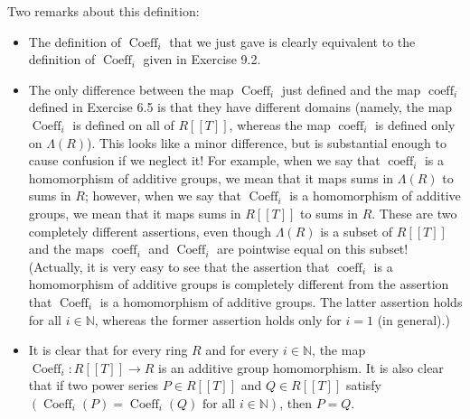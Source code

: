 \documentclass[numbers=enddot,12pt,final,onecolumn,notitlepage]{scrartcl}%
\begin{document}
Two remarks about this definition:

\begin{itemize}
\item The definition of $\operatorname*{Coeff}\nolimits_{i}$ that we just gave
is clearly equivalent to the definition of $\operatorname*{Coeff}%
\nolimits_{i}$ given in Exercise 9.2.

\item The only difference between the map $\operatorname*{Coeff}\nolimits_{i}$
just defined and the map $\operatorname*{coeff}\nolimits_{i}$ defined in
Exercise 6.5 is that they have different domains (namely, the map
$\operatorname*{Coeff}\nolimits_{i}$ is defined on all of $R\left[  \left[
T\right]  \right]  $, whereas the map $\operatorname*{coeff}\nolimits_{i}$ is
defined only on $\Lambda\left(  R\right)  $). This looks like a minor
difference, but is substantial enough to cause confusion if we neglect it! For
example, when we say that $\operatorname*{coeff}\nolimits_{i}$ is a
homomorphism of additive groups, we mean that it maps sums in $\Lambda\left(
R\right)  $ to sums in $R$; however, when we say that $\operatorname*{Coeff}%
\nolimits_{i}$ is a homomorphism of additive groups, we mean that it maps sums
in $R\left[  \left[  T\right]  \right]  $ to sums in $R$. These are two
completely different assertions, even though $\Lambda\left(  R\right)  $ is a
subset of $R\left[  \left[  T\right]  \right]  $ and the maps
$\operatorname*{coeff}\nolimits_{i}$ and $\operatorname*{Coeff}\nolimits_{i}$
are pointwise equal on this subset! (Actually, it is very easy to see that the
assertion that $\operatorname*{coeff}\nolimits_{i}$ is a homomorphism of
additive groups is completely different from the assertion that
$\operatorname*{Coeff}\nolimits_{i}$ is a homomorphism of additive groups. The
latter assertion holds for all $i\in\mathbb{N}$, whereas the former assertion
holds only for $i=1$ (in general).)

\item It is clear that for every ring $R$ and for every $i\in\mathbb{N}$, the
map $\operatorname*{Coeff}\nolimits_{i}:R\left[  \left[  T\right]  \right]
\rightarrow R$ is an additive group homomorphism. It is also clear that if two
power series $P\in R\left[  \left[  T\right]  \right]  $ and $Q\in R\left[
\left[  T\right]  \right]  $ satisfy $\left(  \operatorname*{Coeff}%
\nolimits_{i}\left(  P\right)  =\operatorname*{Coeff}\nolimits_{i}\left(
Q\right)  \text{ for all }i\in\mathbb{N}\right)  $, then $P=Q$.
\end{itemize}
\end{document}
